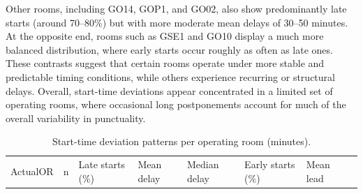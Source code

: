 \documentclass[
]{article}
\begin{document}
Other rooms, including GO14, GOP1, and GO02, also show predominantly
late starts (around 70--80\%) but with more moderate mean delays of
30--50 minutes. At the opposite end, rooms such as GSE1 and GO10 display
a much more balanced distribution, where early starts occur roughly as
often as late ones. These contrasts suggest that certain rooms operate
under more stable and predictable timing conditions, while others
experience recurring or structural delays. Overall, start-time
deviations appear concentrated in a limited set of operating rooms,
where occasional long postponements account for much of the overall
variability in punctuality.

\begin{longtable}[]{@{}
  >{\centering\arraybackslash}p{}
  >{\centering\arraybackslash}p{}
  >{\centering\arraybackslash}p{}
  >{\centering\arraybackslash}p{}
  >{\centering\arraybackslash}p{}
  >{\centering\arraybackslash}p{}
  >{\centering\arraybackslash}p{}
  >{\centering\arraybackslash}p{}@{}}
\caption{Start-time deviation patterns per operating room (minutes).
\label{tab:start_diff_or}}\tabularnewline
\toprule\noalign{}
\begin{minipage}[b]{\linewidth}\centering
ActualOR
\end{minipage} & \begin{minipage}[b]{\linewidth}\centering
n
\end{minipage} & \begin{minipage}[b]{\linewidth}\centering
Late starts (\%)
\end{minipage} & \begin{minipage}[b]{\linewidth}\centering
Mean delay
\end{minipage} & \begin{minipage}[b]{\linewidth}\centering
Median delay
\end{minipage} & \begin{minipage}[b]{\linewidth}\centering
Early starts (\%)
\end{minipage} & \begin{minipage}[b]{\linewidth}\centering
Mean lead
\end{minipage} & \begin{minipage}[b]{\linewidth}\centering

\end{minipage}
\end{longtable}
\end{document}
